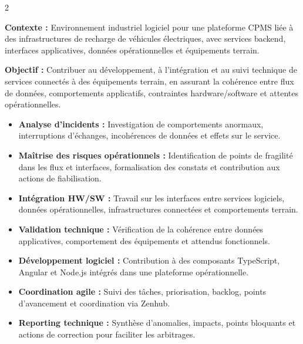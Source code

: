 \documentclass[8pt,a4paper,ragged2e,withhyper]{altacv}
\begin{document}



\makecvheader
\vspace{-0.3cm}


\begin{paracol}{2}



\textbf{Contexte :} Environnement industriel logiciel pour une plateforme CPMS liée à des infrastructures de recharge de véhicules électriques, avec services backend, interfaces applicatives, données opérationnelles et équipements terrain.

\textbf{Objectif :} Contribuer au développement, à l’intégration et au suivi technique de services connectés à des équipements terrain, en assurant la cohérence entre flux de données, comportements applicatifs, contraintes hardware/software et attentes opérationnelles.

\begin{itemize}
  \item \textbf{Analyse d’incidents :} Investigation de comportements anormaux, interruptions d’échanges, incohérences de données et effets sur le service.
  \item \textbf{Maîtrise des risques opérationnels :} Identification de points de fragilité dans les flux et interfaces, formalisation des constats et contribution aux actions de fiabilisation.
  \item \textbf{Intégration HW/SW :} Travail sur les interfaces entre services logiciels, données opérationnelles, infrastructures connectées et comportements terrain.
  \item \textbf{Validation technique :} Vérification de la cohérence entre données applicatives, comportement des équipements et attendus fonctionnels.
  \item \textbf{Développement logiciel :} Contribution à des composants TypeScript, Angular et Node.js intégrés dans une plateforme opérationnelle.
  \item \textbf{Coordination agile :} Suivi des tâches, priorisation, backlog, points d’avancement et coordination via Zenhub.
  \item \textbf{Reporting technique :} Synthèse d’anomalies, impacts, points bloquants et actions de correction pour faciliter les arbitrages.
\end{itemize}


\end{paracol}
\end{document}
